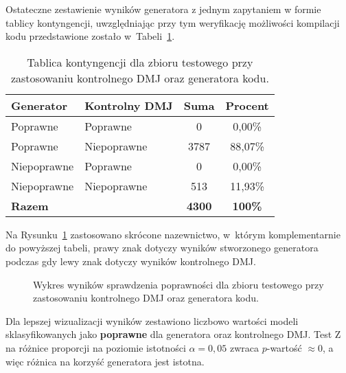 Ostateczne zestawienie wyników generatora z jednym zapytaniem w formie tablicy kontyngencji, uwzględniając przy tym weryfikację możliwości kompilacji kodu przedstawione zostało w~Tabeli~\ref{tab:tabela11}.

\begin{table}[H]
\caption{Tablica kontyngencji dla zbioru testowego przy zastosowaniu kontrolnego DMJ oraz generatora kodu.}\label{tab:tabela11}
\centering%
\begin{tabular}{|l|l|c|c|}
\hline
\textbf{Generator} & \textbf{Kontrolny DMJ} & \textbf{Suma} & \textbf{Procent} \\
\hline
Poprawne & Poprawne & 0 & 0,00\% \\
\hline
Poprawne & Niepoprawne & 3787 & 88,07\% \\
\hline
Niepoprawne & Poprawne & 0 & 0,00\% \\
\hline
Niepoprawne & Niepoprawne & 513 & 11,93\% \\
\hline
\textbf{Razem} & & \textbf{4300} & \textbf{100\%} \\
\hline
\end{tabular}
\end{table}

Na Rysunku~\ref{rys:plama2k} zastosowano skrócone nazewnictwo, w~którym komplementarnie do powyższej tabeli, prawy znak dotyczy wyników stworzonego generatora podczas gdy lewy znak dotyczy wyników kontrolnego DMJ.

\begin{figure}[H]
\centering
{}
\caption{Wykres wyników sprawdzenia poprawności dla zbioru testowego przy zastosowaniu kontrolnego DMJ oraz generatora kodu.}\label{rys:plama2k}
\end{figure}

Dla lepszej wizualizacji wyników zestawiono liczbowo wartości modeli sklasyfikowanych jako \textbf{poprawne} dla generatora  oraz kontrolnego DMJ. %
Test Z na różnice proporcji na poziomie istotności $\alpha=0,05$ zwraca $p$-wartość $\approx 0$, a więc różnica na korzyść generatora jest istotna.

